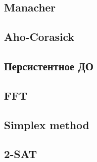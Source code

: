\documentclass{article}
\begin{document}
\begin{multicols}{2}
\subsection{Manacher}

\subsection{Aho-Corasick}

\subsection{Персистентное ДО}

\subsection{FFT}

\subsection{Simplex method}

\subsection{2-SAT}

\end{multicols}
\newpage
\end{document}
